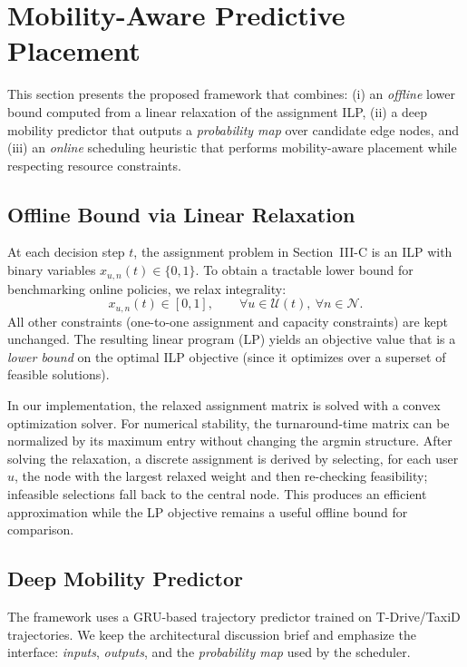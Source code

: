 \section{Mobility-Aware Predictive Placement}
\label{sec:method}

This section presents the proposed framework that combines: (i) an \emph{offline} lower bound computed from a linear relaxation of the assignment ILP, (ii) a deep mobility predictor that outputs a \emph{probability map} over candidate edge nodes, and (iii) an \emph{online} scheduling heuristic that performs mobility-aware placement while respecting resource constraints.

\subsection{Offline Bound via Linear Relaxation}
\label{subsec:lp_bound}

At each decision step \(t\), the assignment problem in Section~III-C is an ILP with binary variables \(x_{u,n}(t)\in\{0,1\}\).
To obtain a tractable lower bound for benchmarking online policies, we relax integrality:
\[
x_{u,n}(t)\in[0,1],\qquad \forall u\in\mathcal{U}(t),\ \forall n\in\mathcal{N}.
\]
All other constraints (one-to-one assignment and capacity constraints) are kept unchanged. The resulting linear program (LP) yields an objective value that is a \emph{lower bound} on the optimal ILP objective (since it optimizes over a superset of feasible solutions).

In our implementation, the relaxed assignment matrix is solved with a convex optimization solver. For numerical stability, the turnaround-time matrix can be normalized by its maximum entry without changing the argmin structure. After solving the relaxation, a discrete assignment is derived by selecting, for each user \(u\), the node with the largest relaxed weight and then re-checking feasibility; infeasible selections fall back to the central node. This produces an efficient approximation while the LP objective remains a useful offline bound for comparison.

\subsection{Deep Mobility Predictor}
\label{subsec:predictor}

The framework uses a GRU-based trajectory predictor trained on T-Drive/TaxiD trajectories. We keep the architectural discussion brief and emphasize the interface: \emph{inputs}, \emph{outputs}, and the \emph{probability map} used by the scheduler.

